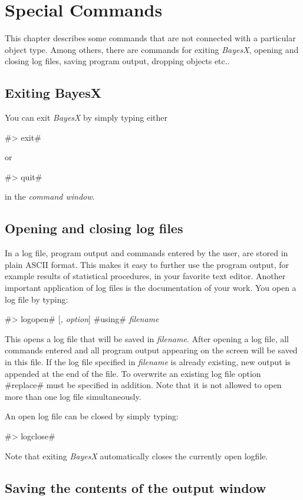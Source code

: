 \chapter{Special Commands}

This chapter describes some commands that are not connected with a
particular object type. Among others, there are commands for
exiting {\em BayesX}, opening and closing log files, saving
program output, dropping objects etc..

\section{Exiting BayesX}

You can exit {\em BayesX} by simply typing either

#> exit#

or

#> quit#

in the {\em command window}.

\section{Opening and closing log files} \label{logfile}

In a log file, program output and commands entered by the user,
are stored in plain ASCII format. This makes it easy to further
use the program output, for example results of statistical
procedures, in your favorite text editor. Another important
application of log files is
the documentation of your work. You open a log file by typing:

#> logopen# [{\em, option}] #using# {\em filename}

This opens a log file that will be saved in {\em filename}. After
opening a log file, all commands entered and all program output
appearing on the screen will be saved in this file. If the
log file specified in  {\em filename} is already existing, new
output is appended at the end of the file. To overwrite an
existing log file option #replace# must be specified in addition.
Note that it is not allowed to open more than one log file
simultaneously.

An open log file can be closed by simply typing:

#> logclose#

Note that exiting {\em BayesX} automatically closes the currently
open logfile.

\section{Saving the contents of the output window}
 

